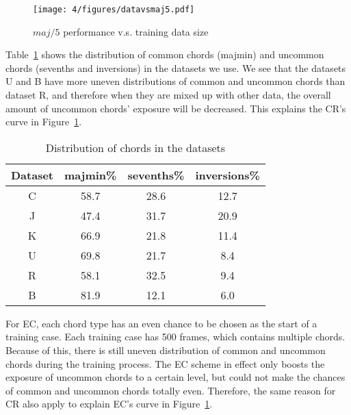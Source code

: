 \begin{figure}[htb]
	\centering
	\texttt{[image: 4/figures/datavsmaj5.pdf]}
	\caption{$maj/5$ performance v.s. training data size}
	\label{fig:4-datavsmaj5}
\end{figure}

Table~\ref{tab:4-chorddist} shows the distribution of common chords (majmin) and uncommon chords (sevenths and inversions) in the datasets we use. We see that the datasets U and B have more uneven distributions of common and uncommon chords than dataset R, and therefore when they are mixed up with other data, the overall amount of uncommon chords' exposure will be decreased. This explains the CR's curve in Figure~\ref{fig:4-datavsmaj5}.
\begin{table}[h]
	\centering
	\scriptsize
	\caption{Distribution of chords in the datasets}
	\label{tab:4-chorddist}
	\begin{tabular}{|c|c|c|c|}\hline
		Dataset & majmin\% & sevenths\% & inversions\%\\ \hline
		C & 58.7 &	28.6 & 12.7\\ \hline
		J & 47.4 & 31.7 & 20.9\\ \hline
		K & 66.9 & 21.8 & 11.4\\ \hline
		U & 69.8 & 21.7 & 8.4\\ \hline
		R & 58.1 & 32.5 & 9.4\\ \hline
		B & 81.9 & 12.1 & 6.0\\ \hline
	\end{tabular}
\end{table}
For EC, each chord type has an even chance to be chosen as the start of a training case. Each training case has 500 frames, which contains multiple chords. Because of this, there is still uneven distribution of common and uncommon chords during the training process. The EC scheme in effect only boosts the exposure of uncommon chords to a certain level, but could not make the chances of common and uncommon chords totally even. Therefore, the same reason for CR also apply to explain EC's curve in Figure~\ref{fig:4-datavsmaj5}.


